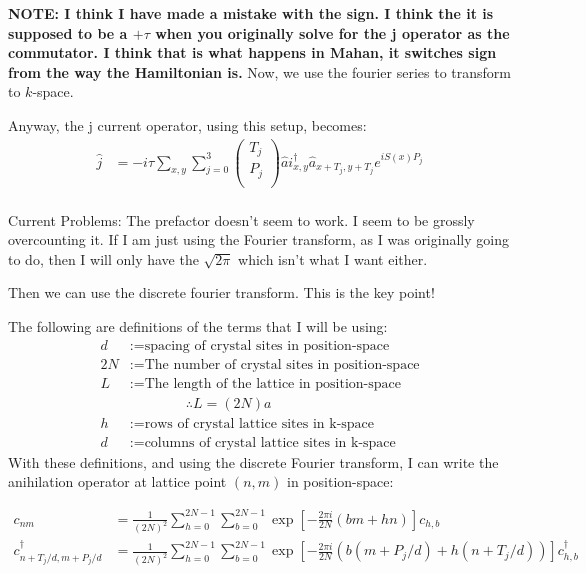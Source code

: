 \documentclass[12pt]{article}
\begin{document}
\textbf{NOTE: I think I have made a mistake with the sign. I think
the it is supposed to be a $+\tau$ when you originally solve for the
j operator as the commutator. I think that is what happens in Mahan, it switches sign from the way the Hamiltonian is. }
Now, we use the fourier series to transform to $k$-space.

Anyway, the j current operator, using this setup, becomes:
\begin{align}
	\hat{j}	&= -i\tau \sum_{x,y} \sum_{j=0}^3 
		\begin{pmatrix}
			T_j \\
			P_j\\
		\end{pmatrix}\hat{a}i^\dagger_{x,y}\hat{a}_{x+T_j, y+T_j} e^{i  S(x) P_j} \\
		\end{align}



Current Problems: The prefactor doesn't seem to work. I seem to be
grossly overcounting it. If I am just using the Fourier transform, 
as I was originally going to do, then I will only have the $\sqrt{2 \pi}$ which isn't what I want either.


Then we can use the discrete fourier transform. This is the key point!

The following are definitions of the terms that I will be using:
\begin{align*}
d &:= \text{spacing of crystal sites in position-space}\\
2N &:= \text{The number of crystal sites in position-space}\\
L &:= \text{The length of the lattice in position-space}\\
&\qquad \qquad \therefore L = (2N) a\\
h &:= \text{rows of crystal lattice sites in k-space}\\
d &:= \text{columns of crystal lattice sites in k-space}
\end{align*}
With these definitions, and using the discrete Fourier transform, I can
write the anihilation operator at lattice point $(n,m)$ in position-space:

\begin{align*}
c_{nm} &= \frac{1}{(2N)^2} \sum^{2N-1}_{h=0} \sum^{2N-1}_{b=0} \exp\left[-\frac{2 \pi i}{2N}(bm+hn)\right] c_{h,b}\\
c^\dagger_{n+T_j/d, m+P_j/d} & = \frac{1}{(2N)^2} \sum^{2N-1}_{h=0} \sum^{2N-1}_{b=0} \exp\left[-\frac{2 \pi i}{2N}(b(m+P_j/d)+h(n+T_j/d))\right] c^\dagger_{h,b}
\end{align*}
\end{document}
